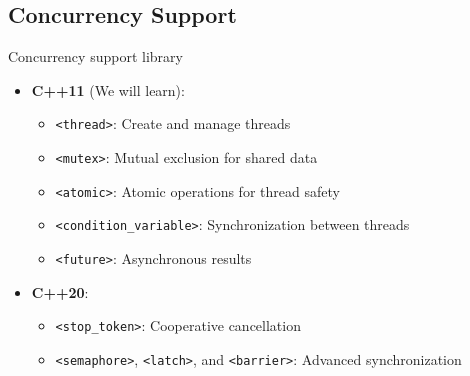 \subsection{Concurrency Support}
\begin{frame}[fragile]{Concurrency support library}
	\begin{itemize}
		\item \textbf{C++11} (We will learn):
		      \begin{itemize}
			      \item \texttt{<thread>}: Create and manage threads
			      \item \texttt{<mutex>}: Mutual exclusion for shared data
			      \item \texttt{<atomic>}: Atomic operations for thread safety
			      \item \texttt{<condition\_variable>}: Synchronization between threads
			      \item \texttt{<future>}: Asynchronous results
		      \end{itemize}
		\item \textbf{C++20}:
		      \begin{itemize}
			      \item \texttt{<stop\_token>}: Cooperative cancellation
			      \item \texttt{<semaphore>}, \texttt{<latch>}, and \texttt{<barrier>}: Advanced synchronization
		      \end{itemize}
	\end{itemize}
\end{frame}
